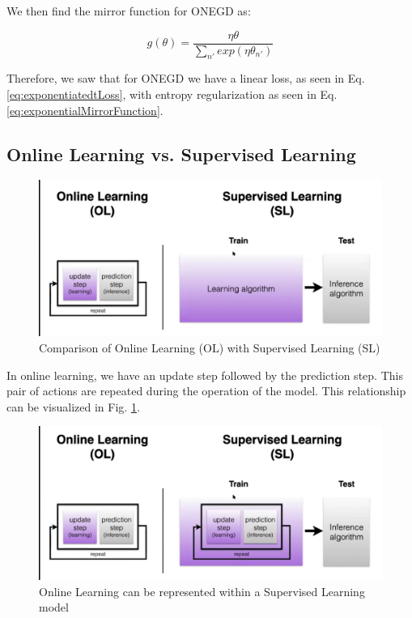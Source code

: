 \documentclass[11pt]{article}
\begin{document}
We then find the mirror function for ONEGD as:

\begin{equation}
    g(\theta) = \dfrac{\eta \theta}{\sum_{n'} exp(\eta\theta_{n'})}
    \label{eq:exponentialMirrorFunction}
\end{equation}

Therefore, we saw that for ONEGD we have a linear loss, as seen in Eq. \ref{eq:exponentiatedtLoss}, with entropy regularization as seen in Eq. \ref{eq:exponentialMirrorFunction}.

\subsection{Online Learning vs. Supervised Learning}

\begin{figure}[H]
\begin{center}
\includegraphics[scale=0.25]{figures/OLSL.png}
\end{center}
\caption{Comparison of Online Learning (OL) with Supervised Learning (SL)}
\label{fig:OLSL}
\end{figure}

In online learning, we have an update step followed by the prediction step. This pair of actions are repeated during the operation of the model. This relationship can be visualized in Fig. \ref{fig:OLSL}.

\begin{figure}[H]
\begin{center}
\includegraphics[scale=0.25]{figures/OLinsideSL.png}
\end{center}
\caption{Online Learning can be represented within a Supervised Learning model}
\label{fig:OLinSL}
\end{figure}
\end{document}
